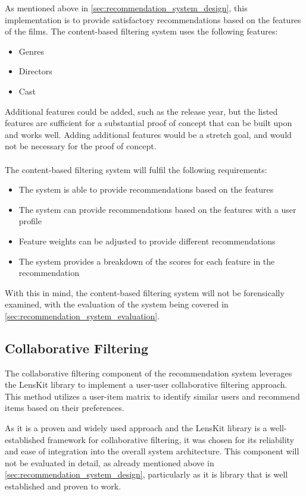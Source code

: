 As mentioned above in \cref{sec:recommendation_system_design}, this implementation is to provide satisfactory recommendations based on the features of the films.
The content-based filtering system uses the following features:
\begin{itemize}
    \item Genres
    \item Directors
    \item Cast
\end{itemize}
Additional features could be added, such as the release year, but the listed features are sufficient for a substantial proof of concept that can be built upon and works well.
Adding additional features would be a stretch goal, and would not be necessary for the proof of concept.
\\\\
The content-based filtering system will fulfil the following requirements:
\begin{itemize}
    \item The system is able to provide recommendations based on the features
    \item The system can provide recommendations based on the features with a user profile
    \item Feature weights can be adjusted to provide different recommendations
    \item The system provides a breakdown of the scores for each feature in the recommendation
\end{itemize}
With this in mind, the content-based filtering system will not be forensically examined, with the evaluation of the system being covered in \cref{sec:recommendation_system_evaluation}.


\subsection{Collaborative Filtering}
\label{sec:collaborative_filtering_design}
The collaborative filtering component of the recommendation system leverages the LensKit library\cite{ekstrand_2020_lenskit} to implement a user-user collaborative filtering approach. This method utilizes a user-item matrix to identify similar users and recommend items based on their preferences.

As it is a proven and widely used approach and the LensKit library is a well-established framework for collaborative filtering, it was chosen for its reliability and ease of integration into the overall system architecture.
This component will not be evaluated in detail, as already mentioned above in \cref{sec:recommendation_system_design}, particularly as it is library that is well established and proven to work.

